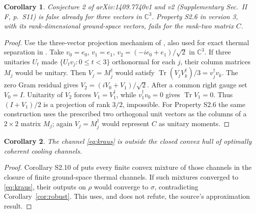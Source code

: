 \documentclass[11pt]{article}
\newtheorem{corollary}{Corollary}
\newcommand{\Tr}{\operatorname{Tr}}
\begin{document}
\begin{corollary}\label{cor:vectors}
Conjecture 2 of arXiv:1409.7740v1 and v2 (Supplementary Sec.\ II F,
p.\ S11) is false already for three vectors in $\mathbb C^3$.
Property S2.6 in version 3, with its rank-dimensional ground-space
vectors, fails for the rank-two matrix $C$.
\end{corollary}
\begin{proof}
Use the three-vector projection mechanism of
\cite[Proposition 3.2 and Example 3.4]{MR}, also used for exact thermal
separation in \cite[Supplement, Eqs.\ (4)--(10)]{MA}.
Take $v_0=e_0$, $v_1=e_1$, $v_2=(-ie_0+e_1)/\sqrt2$ in $\mathbb C^3$.
If three unitaries $U_t$ made $\{U_tv_j:0\leq t<3\}$ orthonormal for
each $j$, their column matrices $M_j$ would be unitary.
Then $V_j=M_j^\dagger$ would satisfy
$\Tr(V_jV_k^\dagger)/3=v_j^\dagger v_k$.
The zero Gram residual gives $V_2=(iV_0+V_1)/\sqrt2$.
After a common right gauge set $V_0=I$. Unitarity of $V_2$ forces
$V_1=V_1^\dagger$, while $v_1^\dagger v_0=0$ gives $\Tr V_1=0$.
Thus $(I+V_1)/2$ is a projection of rank $3/2$, impossible.
For Property S2.6 the same construction uses the prescribed two
orthogonal unit vectors as the columns of a $2\times2$ matrix $M_j$;
again $V_j=M_j^\dagger$ would represent $C$ as unitary moments.
\end{proof}

\begin{corollary}\label{cor:mixtures}
The channel \eqref{eq:kraus} is outside the closed convex hull of
optimally coherent cooling channels.
\end{corollary}
\begin{proof}
Corollary S2.10 of \cite{NG} puts every finite convex mixture of those
channels in the closure of finite ground-space thermal channels.
If such mixtures converged to \eqref{eq:kraus}, their outputs on $\rho$
would converge to $\sigma$, contradicting Corollary~\ref{cor:robust}.
This uses, and does not refute, the source's approximation result.
\end{proof}
\end{document}
